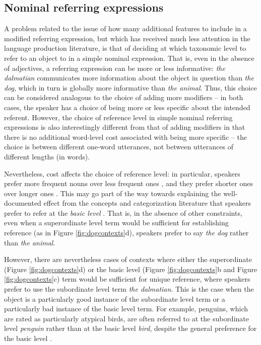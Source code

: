 \documentclass[11pt]{article}
\newcommand{\figref}[1]{Figure \ref{#1}}
\begin{document}
\subsection{Nominal referring expressions}
\label{sec:nominal}

A problem related to the issue of how many additional features to include in a modified referring expression, but which has received much less attention in the language production literature, is that of deciding at which taxonomic level to refer to an object to in a simple nominal expression. That is, even in the absence of adjectives, a referring expression can be more or less informative: \emph{the dalmatian} communicates more information about the object in question than \emph{the dog}, which in turn is globally more informative than \emph{the animal}. Thus, this choice can be considered analogous to the choice of adding more modifiers -- in both cases, the speaker has a choice of being more or less specific about the intended referent. However, the choice of reference level in simple nominal referring expressions is also interestingly different from that of adding modifiers in that there is no additional word-level cost associated with being more specific -- the choice is between different one-word utterances, not between utterances of different lengths (in words). 

Nevertheless, cost affects the choice of reference level: in particular, speakers prefer more frequent nouns over less frequent ones \cite{bla}, and they prefer shorter ones over longer ones \cite{bla}. This may go part of the way towards explaining the well-documented effect from the concepts and categorization literature that speakers prefer to refer at the \emph{basic level} \cite{Rosch1976, Tanaka1991}. That is, in the absence of other constraints, even when a superordinate level term would be sufficient for establishing reference (as in \figref{fig:dogcontexts}d), speakers prefer to say \emph{the dog} rather than \emph{the animal}. 

However, there are nevertheless cases  of contexts where either the superordinate (\figref{fig:dogcontexts}d) or the basic level (\figref{fig:dogcontexts}b and \figref{fig:dogcontexts}c) term would be sufficient for unique reference, where speakers prefer to use the subordinate level term \emph{the dalmatian}. This is the case when the object is a particularly good instance of the subordinate level term or a particularly bad instance of the basic level term. For example, penguins, which are rated as particularly atypical birds, are often referred to at the subordinate level \emph{penguin} rather than at the basic level \emph{bird}, despite the general preference for the basic level \cite{Jolicoeur1984}.
\end{document}
